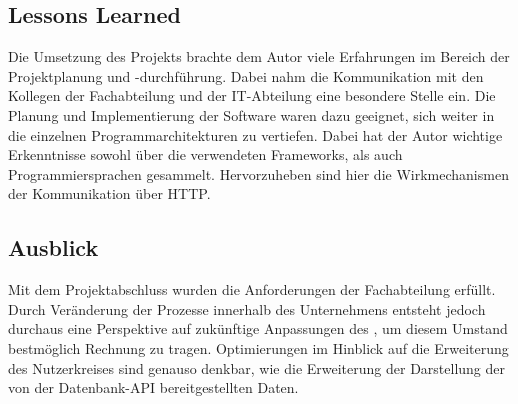 \subsection{Lessons Learned}
\label{sec:LessonsLearned}
Die Umsetzung des Projekts brachte dem Autor viele Erfahrungen im Bereich der Projektplanung und -durchführung.
Dabei nahm die Kommunikation mit den Kollegen der Fachabteilung und der IT-Abteilung eine besondere Stelle ein.
Die Planung und Implementierung der Software waren dazu geeignet, sich weiter in die einzelnen Programmarchitekturen zu vertiefen.
Dabei hat der Autor wichtige Erkenntnisse sowohl über die verwendeten Frameworks, als auch Programmiersprachen gesammelt.
Hervorzuheben sind hier die Wirkmechanismen der Kommunikation über \acs{HTTP}.

\subsection{Ausblick}
\label{sec:Ausblick}
Mit dem Projektabschluss wurden die Anforderungen der Fachabteilung erfüllt.
Durch Veränderung der Prozesse innerhalb des Unternehmens entsteht jedoch durchaus
eine Perspektive auf zukünftige Anpassungen des , um diesem Umstand bestmöglich
Rechnung zu tragen. Optimierungen im Hinblick auf die Erweiterung des Nutzerkreises
sind genauso denkbar, wie die Erweiterung der Darstellung der von der Datenbank-API bereitgestellten Daten.
